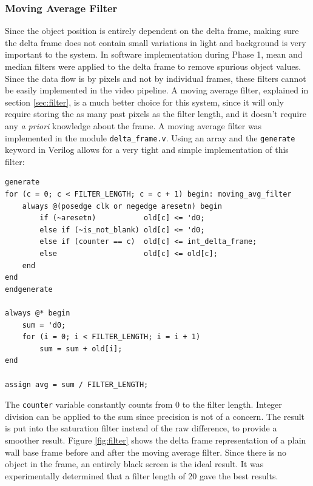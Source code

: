 \documentclass[11pt]{article} %
\begin{document}
\subsubsection{Moving Average Filter}
Since the object position is entirely dependent on the delta frame, making sure the delta frame does not contain small variations in light and background is very important to the system. In software implementation during Phase 1, mean and median filters were applied to the delta frame to remove spurious object values. Since the data flow is by pixels and not by individual frames, these filters cannot be easily implemented in the video pipeline. A moving average filter, explained in section \ref{sec:filter}, is a much better choice for this system, since it will only require storing the as many past pixels as the filter length, and it doesn't require any \textit{a priori} knowledge about the frame. A moving average filter was implemented in the module \texttt{delta\_frame.v}. Using an array and the \texttt{generate} keyword in Verilog allows for a very tight and simple implementation of this filter:
\begin{verbatim}
generate 
for (c = 0; c < FILTER_LENGTH; c = c + 1) begin: moving_avg_filter
    always @(posedge clk or negedge aresetn) begin
        if (~aresetn)           old[c] <= 'd0;
        else if (~is_not_blank) old[c] <= 'd0;
        else if (counter == c)  old[c] <= int_delta_frame;
        else                    old[c] <= old[c];
    end
end
endgenerate

always @* begin
    sum = 'd0;
    for (i = 0; i < FILTER_LENGTH; i = i + 1)
        sum = sum + old[i];
end

assign avg = sum / FILTER_LENGTH;
\end{verbatim}
The \texttt{counter} variable constantly counts from 0 to the filter length. Integer division can be applied to the sum since precision is not of a concern. The result is put into the saturation filter instead of the raw difference, to provide a smoother result. Figure \ref{fig:filter} shows the delta frame representation of a plain wall base frame before and after the moving average filter. Since there is no object in the frame, an entirely black screen is the ideal result. It was experimentally determined that a filter length of 20 gave the best results.
\end{document}
